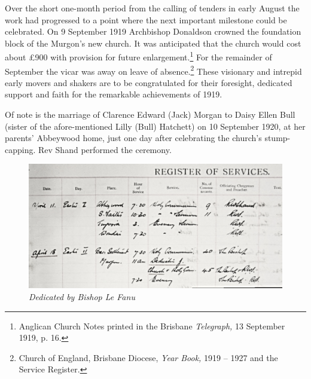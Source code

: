 Over the short one-month period from the calling of tenders in early August the work had progressed to a point where the next important milestone could be celebrated. On 9 September 1919 Archbishop Donaldson crowned the foundation block of the Murgon's new church. It was anticipated that the church would cost about \pounds900 with provision for future enlargement.\footnote{Anglican Church Notes printed in the Brisbane \emph{Telegraph,} 13 September 1919, p. 16.} For the remainder of September the vicar was away on leave of absence.\footnote{Church of England, Brisbane Diocese, \emph{Year Book,} 1919 -- 1927 and the Service Register.} These visionary and intrepid early movers and shakers are to be congratulated for their foresight, dedicated support and faith for the remarkable achievements of 1919.


Of note is the marriage of Clarence Edward (Jack) Morgan to Daisy Ellen Bull (sister of the afore-mentioned Lilly (Bull) Hatchett) on 10 September 1920, at her parents' Abbeywood home, just one day after celebrating the church's stump-capping. Rev Shand performed the ceremony.









\begin{figure}[!htb]
\begin{center}
\includegraphics[width=1.\textwidth,center]{../images/dedicationByBishopLeFanu.jpg}
\caption{\itshape Dedicated by Bishop Le Fanu}
\end{center}
\end{figure}




